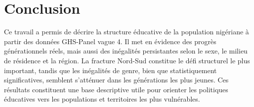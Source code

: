 \documentclass[
  11pt,
]{article}
\begin{document}
\section{Conclusion}\label{conclusion}

Ce travail a permis de décrire la structure éducative de la population
nigériane à partir des données GHS-Panel vague 4. Il met en évidence des
progrès générationnels réels, mais aussi des inégalités persistantes
selon le sexe, le milieu de résidence et la région. La fracture Nord-Sud
constitue le défi structurel le plus important, tandis que les
inégalités de genre, bien que statistiquement significatives, semblent
s'atténuer dans les générations les plus jeunes. Ces résultats
constituent une base descriptive utile pour orienter les politiques
éducatives vers les populations et territoires les plus vulnérables.
\end{document}
